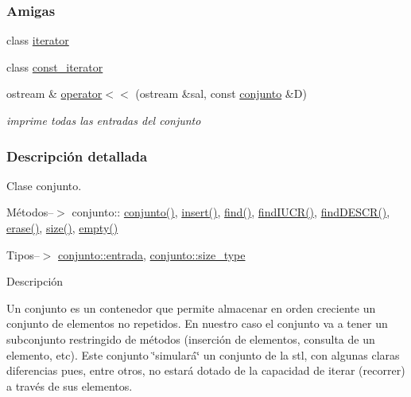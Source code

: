 \subsubsection*{Amigas}
\begin{DoxyCompactItemize}
\item 
class \hyperlink{classconjunto_a67171474c4da6cc8efe0c7fafefd2b2d}{iterator}
\item 
class \hyperlink{classconjunto_ac220ce1c155db1ac44146c12d178056f}{const\+\_\+iterator}
\item 
ostream \& \hyperlink{classconjunto_ae54b721035471d372f29c0335c42734a}{operator$<$$<$} (ostream \&sal, const \hyperlink{classconjunto}{conjunto} \&D)
\begin{DoxyCompactList}\small\item\em imprime todas las entradas del conjunto \end{DoxyCompactList}\end{DoxyCompactItemize}


\subsubsection{Descripción detallada}
Clase conjunto. 

Métodos--$>$ conjunto\+:\+: \hyperlink{classconjunto_a16d987f42c679efab01748178ba45891}{conjunto()}, \hyperlink{classconjunto_aa65b9f7c4cb9bad6d4e40c1973095930}{insert()}, \hyperlink{classconjunto_a2459d07b15a25a474f1be8dc0038feb5}{find()}, \hyperlink{classconjunto_a2ca2a7b59bce8369e9d9ccc1c7be9614}{find\+I\+U\+C\+R()}, \hyperlink{classconjunto_afff3e7f4b3d00f422dd7ab2fec935378}{find\+D\+E\+S\+C\+R()}, \hyperlink{classconjunto_ad550177fa4454da3a10fa356417e39a7}{erase()}, \hyperlink{classconjunto_a863e1e106e35adda47e7c5e2067295b9}{size()}, \hyperlink{classconjunto_afcf4ff3ff3c1f83b63e901efebe93533}{empty()}

Tipos--$>$ \hyperlink{classconjunto_a09cad766dd65de73e51eae21f9d22585}{conjunto\+::entrada}, \hyperlink{classconjunto_a855a5893bb0f5a851ab2dbf2b8aa6cc7}{conjunto\+::size\+\_\+type}

Descripción

Un conjunto es un contenedor que permite almacenar en orden creciente un conjunto de elementos no repetidos. En nuestro caso el conjunto va a tener un subconjunto restringido de métodos (inserción de elementos, consulta de un elemento, etc). Este conjunto \char`\"{}simulará\char`\"{} un conjunto de la stl, con algunas claras diferencias pues, entre otros, no estará dotado de la capacidad de iterar (recorrer) a través de sus elementos.

